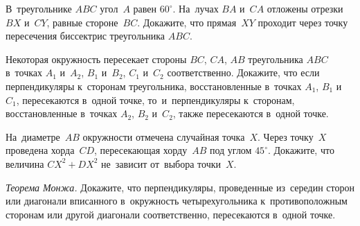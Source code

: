 \begin{problems}
\item
В~треугольнике $ABC$ угол~$A$ равен $60^\circ$.
На~лучах $BA$ и~$CA$ отложены отрезки $BX$ и~$CY$, равные стороне~$BC$.
Докажите, что прямая~$XY$ проходит через точку пересечения биссектрис
треугольника $ABC$.

\item
Некоторая окружность пересекает стороны $BC$, $CA$, $AB$ треугольника $ABC$
в~точках $A_1$ и~$A_2$, $B_1$ и~$B_2$, $C_1$ и~$C_2$ соответственно.
Докажите, что если перпендикуляры к~сторонам треугольника, восстановленные
в~точках $A_1$, $B_1$ и~$C_1$, пересекаются в~одной точке, то~и~перпендикуляры
к~сторонам, восстановленные в~точках $A_2$, $B_2$ и~$C_2$, также пересекаются
в~одной точке.

\item
На~диаметре~$AB$ окружности отмечена случайная точка~$X$.
Через точку~$X$ проведена хорда~$CD$, пересекающая хорду~$AB$ под углом
$45^{\circ}$.
Докажите, что величина $CX^2 + DX^2$ не~зависит от~выбора точки~$X$.

\item\emph{Теорема Монжа.}
Докажите, что перпендикуляры, проведенные из~середин сторон или диагонали
вписанного в~окружность четырехугольника к~противоположным сторонам или
другой диагонали соответственно, пересекаются в~одной точке.

\end{problems}


